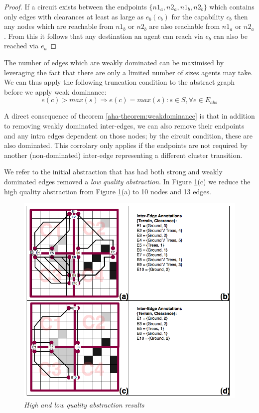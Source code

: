 \begin{proof}
If a circuit exists between the endpoints $\lbrace n1_{a}, n2_{a}, n1_{b}, n2_{b} \rbrace$ which contains only edges with clearances at least as large as $e_{b}(c_{b})$ for the capability $c_{b}$ then any nodes which are reachable from $n1_{b}$ or $n2_{b}$ are also reachable from $n1_{a}$ or $n2_{a}$.
From this it follows that any destination an agent can reach via $e_{b}$ can also be reached via $e_{a}$ 
\end{proof}
The number of edges which are weakly dominated can be maximised by leveraging the fact that there are only a limited number of sizes agents may take. We can thus apply the following truncation condition to the abstract graph before we apply weak dominance:
\begin{equation}
e(c) > max(s) \Rightarrow e(c) = max(s) : s \in S, \forall e \in E_{abs}
\end{equation}
\par \indent
A direct consequence of theorem \ref{aha-theorem:weakdominance} is that in addition to removing weakly dominated inter-edges, we can also remove their endpoints and any intra edges dependent on those nodes; by the circuit condition, these are also dominated. 
This corrolary only applies if the endpoints are not required by another (non-dominated) inter-edge representing a different cluster transition. 
\par \indent
We refer to the initial abstraction that has had both strong and weakly dominated edges removed a \emph{low quality abstraction}.
In Figure \ref{aha-fig:abstractgraph}(c) we reduce the high quality abstraction from Figure \ref{aha-fig:abstractgraph}(a) to 10 nodes and 13 edges.
\begin{figure}[htbp]
        \caption{\emph{High and low quality abstraction results} }
        \begin{center}
                        \includegraphics[scale=0.25]{diagrams/abstraction_result.png}
        \end{center}
        \label{aha-fig:abstractgraph}
\end{figure}
